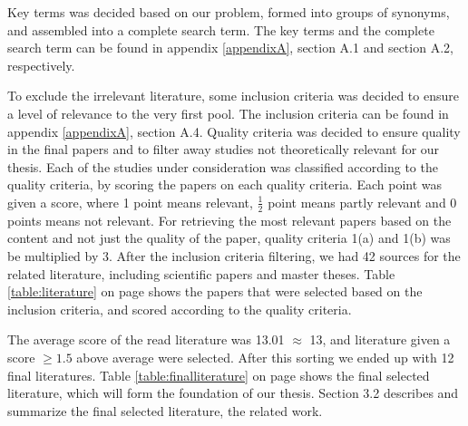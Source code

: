 Key terms was decided based on our problem, formed into groups of synonyms, and assembled into a complete search term. The key terms and the complete search term can be found in appendix \ref{appendixA}, section A.1 and section A.2, respectively.

To exclude the irrelevant literature, some inclusion criteria was decided to ensure a level of relevance to the very first pool. The inclusion criteria can be found in appendix \ref{appendixA}, section A.4. Quality criteria was decided to ensure quality in the final papers and to filter away studies not theoretically relevant for our thesis. Each of the studies under consideration was classified according to the quality criteria, by scoring the papers on each quality criteria. Each point was given a score, where 1 point means relevant, $\frac{1}{2}$ point means partly relevant and 0 points means not relevant. For retrieving the most relevant papers based on the content and not just the quality of the paper, quality criteria 1(a) and 1(b) was be multiplied by 3. After the inclusion criteria filtering, we had 42 sources for the related literature, including scientific papers and master theses. Table \ref{table:literature} on page \pageref{table:literature} shows the papers that were selected based on the inclusion criteria, and scored according to the quality criteria. 

The average score of the read literature was 13.01 $\approx$ 13, and literature given a score $\geq{1.5}$ above average were selected. After this sorting we ended up with 12 final literatures. Table \ref{table:finalliterature} on page \pageref{table:finalliterature} shows the final selected literature, which will form the foundation of our thesis. Section 3.2 describes and summarize the final selected literature, the related work.
